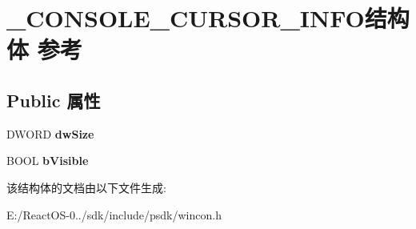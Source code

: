 \hypertarget{struct___c_o_n_s_o_l_e___c_u_r_s_o_r___i_n_f_o}{}\section{\+\_\+\+C\+O\+N\+S\+O\+L\+E\+\_\+\+C\+U\+R\+S\+O\+R\+\_\+\+I\+N\+F\+O结构体 参考}
\label{struct___c_o_n_s_o_l_e___c_u_r_s_o_r___i_n_f_o}
\subsection*{Public 属性}
\begin{DoxyCompactItemize}
\item 
\mbox{\label{struct___c_o_n_s_o_l_e___c_u_r_s_o_r___i_n_f_o_abd04c7c46a9ff62af67e4dc457ee09f1}} 
D\+W\+O\+RD {\bfseries dw\+Size}
\item 
\mbox{\label{struct___c_o_n_s_o_l_e___c_u_r_s_o_r___i_n_f_o_aca9648c0e500ffcf0d91093c6a9a7495}} 
B\+O\+OL {\bfseries b\+Visible}
\end{DoxyCompactItemize}


该结构体的文档由以下文件生成\+:\begin{DoxyCompactItemize}
\item 
E\+:/\+React\+O\+S-\/0../sdk/include/psdk/wincon.\+h\end{DoxyCompactItemize}
